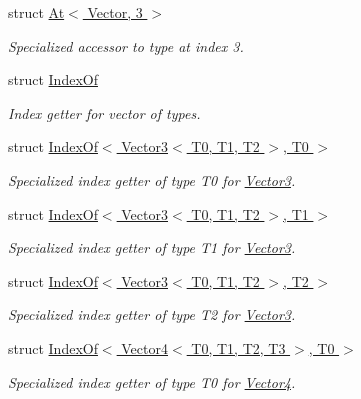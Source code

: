 \begin{DoxyCompactItemize}
struct \hyperlink{struct_d_o_1_1_meta_1_1_at_3_01_vector_00_013_01_4}{At$<$ Vector, 3 $>$}
\begin{DoxyCompactList}\small\item\em Specialized accessor to type at index 3. \end{DoxyCompactList}\item 
struct \hyperlink{struct_d_o_1_1_meta_1_1_index_of}{Index\-Of}
\begin{DoxyCompactList}\small\item\em Index getter for vector of types. \end{DoxyCompactList}\item 
struct \hyperlink{struct_d_o_1_1_meta_1_1_index_of_3_01_vector3_3_01_t0_00_01_t1_00_01_t2_01_4_00_01_t0_01_4}{Index\-Of$<$ Vector3$<$ T0, T1, T2 $>$, T0 $>$}
\begin{DoxyCompactList}\small\item\em Specialized index getter of type T0 for \hyperlink{struct_d_o_1_1_meta_1_1_vector3}{Vector3}. \end{DoxyCompactList}\item 
struct \hyperlink{struct_d_o_1_1_meta_1_1_index_of_3_01_vector3_3_01_t0_00_01_t1_00_01_t2_01_4_00_01_t1_01_4}{Index\-Of$<$ Vector3$<$ T0, T1, T2 $>$, T1 $>$}
\begin{DoxyCompactList}\small\item\em Specialized index getter of type T1 for \hyperlink{struct_d_o_1_1_meta_1_1_vector3}{Vector3}. \end{DoxyCompactList}\item 
struct \hyperlink{struct_d_o_1_1_meta_1_1_index_of_3_01_vector3_3_01_t0_00_01_t1_00_01_t2_01_4_00_01_t2_01_4}{Index\-Of$<$ Vector3$<$ T0, T1, T2 $>$, T2 $>$}
\begin{DoxyCompactList}\small\item\em Specialized index getter of type T2 for \hyperlink{struct_d_o_1_1_meta_1_1_vector3}{Vector3}. \end{DoxyCompactList}\item 
struct \hyperlink{struct_d_o_1_1_meta_1_1_index_of_3_01_vector4_3_01_t0_00_01_t1_00_01_t2_00_01_t3_01_4_00_01_t0_01_4}{Index\-Of$<$ Vector4$<$ T0, T1, T2, T3 $>$, T0 $>$}
\begin{DoxyCompactList}\small\item\em Specialized index getter of type T0 for \hyperlink{struct_d_o_1_1_meta_1_1_vector4}{Vector4}. \end{DoxyCompactList}\item 

\end{DoxyCompactItemize}
